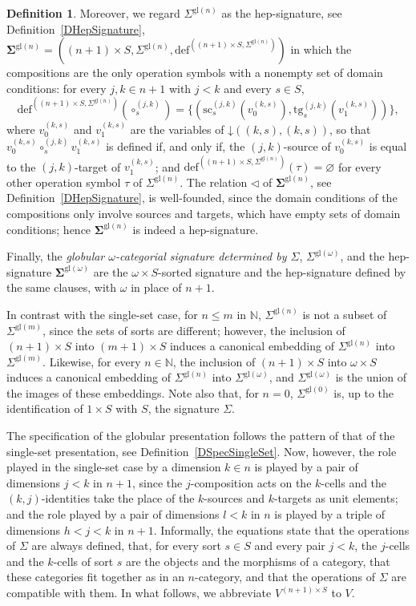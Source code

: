 \documentclass[a4paper, reqno
]{amsart}
\newcommand{\vs}[1]{\mathbin{\downarrow}#1}
\newcommand{\sig}[1]{\mathbf{#1}}             %
\newcommand{\gl}{\mathrm{gl}}                %
\newcommand{\src}{\mathrm{sc}}
\newcommand{\tgt}{\mathrm{tg}}
\theoremstyle{plain}
\theoremstyle{definition}
\newtheorem{definition}[theorem]{Definition}
\begin{document}
\begin{definition}
Moreover, we regard $\Sigma^{\gl(n)}$ as the hep-signature, see Definition~\ref{DHepSignature}, $\sig{\Sigma}^{\gl(n)}=((n+1)\times S,\Sigma^{\gl(n)},\mathrm{def}^{((n+1)\times S,\Sigma^{\gl(n)})})$ in which the compositions are the only operation symbols with a nonempty set of domain conditions: for every $j,k\in n+1$ with $j<k$ and every $s\in S$,
$$
\mathrm{def}^{((n+1)\times S,\Sigma^{\gl(n)})}(\circ^{(j,k)}_{s})=\{(\src^{(j,k)}_{s}(v^{(k,s)}_{0}),\tgt^{(j,k)}_{s}(v^{(k,s)}_{1}))\},
$$
where $v^{(k,s)}_{0}$ and $v^{(k,s)}_{1}$ are the variables of $\vs{((k,s),(k,s))}$, so that $v^{(k,s)}_{0}\circ^{(j,k)}_{s}v^{(k,s)}_{1}$ is defined if, and only if, the $(j,k)$-source of $v^{(k,s)}_{0}$ is equal to the $(j,k)$-target of $v^{(k,s)}_{1}$; and $\mathrm{def}^{((n+1)\times S,\Sigma^{\gl(n)})}(\tau)=\varnothing$ for every other operation symbol $\tau$ of $\Sigma^{\gl(n)}$.
The relation $\lhd$ of $\sig{\Sigma}^{\gl(n)}$, see Definition~\ref{DHepSignature}, is well-founded, since the domain conditions of the compositions only involve sources and targets, which have empty sets of domain conditions; hence $\sig{\Sigma}^{\gl(n)}$ is indeed a hep-signature.

Finally, the \emph{globular $\omega$-categorial signature determined by $\Sigma$}, $\Sigma^{\gl(\omega)}$, and the hep-signature $\sig{\Sigma}^{\gl(\omega)}$ are the $\omega\times S$-sorted signature and the hep-signature defined by the same clauses, with $\omega$ in place of $n+1$.
\end{definition}

In contrast with the single-set case, for $n\leq m$ in $\mathbb{N}$, $\Sigma^{\gl(n)}$ is not a subset of $\Sigma^{\gl(m)}$, since the sets of sorts are different; however, the inclusion of $(n+1)\times S$ into $(m+1)\times S$ induces a canonical embedding of $\Sigma^{\gl(n)}$ into $\Sigma^{\gl(m)}$.
Likewise, for every $n\in\mathbb{N}$, the inclusion of $(n+1)\times S$ into $\omega\times S$ induces a canonical embedding of $\Sigma^{\gl(n)}$ into $\Sigma^{\gl(\omega)}$, and $\Sigma^{\gl(\omega)}$ is the union of the images of these embeddings.
Note also that, for $n=0$, $\Sigma^{\gl(0)}$ is, up to the identification of $1\times S$ with $S$, the signature $\Sigma$.

The specification of the globular presentation follows the pattern of that of the single-set presentation, see Definition~\ref{DSpecSingleSet}.
Now, however, the role played in the single-set case by a dimension $k\in n$ is played by a pair of dimensions $j<k$ in $n+1$, since the $j$-composition acts on the $k$-cells and the $(k,j)$-identities take the place of the $k$-sources and $k$-targets as unit elements; and the role played by a pair of dimensions $l<k$ in $n$ is played by a triple of dimensions $h<j<k$ in $n+1$.
Informally, the equations state that the operations of $\Sigma$ are always defined, that, for every sort $s\in S$ and every pair $j<k$, the $j$-cells and the $k$-cells of sort $s$ are the objects and the morphisms of a category, that these categories fit together as in an $n$-category, and that the operations of $\Sigma$ are compatible with them.
In what follows, we abbreviate $V^{(n+1)\times S}$ to $V$.
\end{document}
